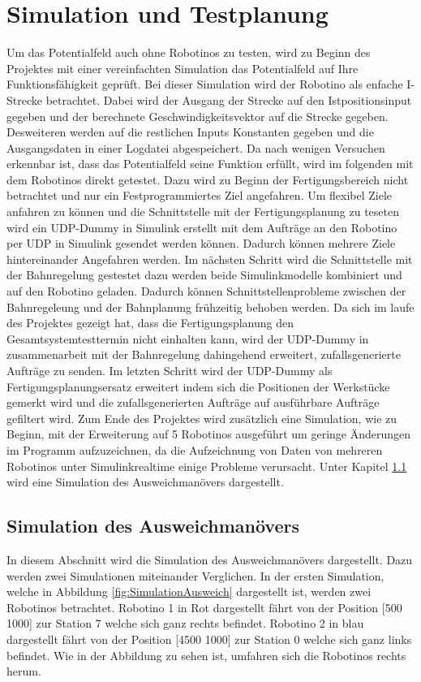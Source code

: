 \chapter{Simulation und Testplanung}
Um das Potentialfeld auch ohne Robotinos zu testen, wird zu Beginn des Projektes mit einer vereinfachten Simulation das Potentialfeld auf Ihre Funktionsfähigkeit geprüft. Bei dieser Simulation wird der Robotino als enfache I-Strecke betrachtet. Dabei wird der Ausgang der Strecke auf den Istpositionsinput gegeben und der berechnete Geschwindigkeitsvektor auf die Strecke gegeben. Desweiteren werden auf die restlichen Inputs Konstanten gegeben und die Ausgangsdaten in einer Logdatei abgespeichert. Da nach wenigen Versuchen erkennbar ist, dass das Potentialfeld seine Funktion erfüllt, wird im folgenden mit dem Robotinos direkt getestet. Dazu wird zu Beginn der Fertigungsbereich nicht betrachtet und nur ein Festprogrammiertes Ziel angefahren. Um flexibel Ziele anfahren zu können und die Schnittstelle mit der Fertigungsplanung zu teseten wird ein UDP-Dummy in Simulink erstellt mit dem Aufträge an den Robotino per UDP in Simulink gesendet werden können. Dadurch können mehrere Ziele hintereinander Angefahren werden. Im nächsten Schritt wird die Schnittstelle mit der Bahnregelung gestestet dazu werden beide Simulinkmodelle kombiniert und auf den Robotino geladen. Dadurch können Schnittstellenprobleme zwischen der Bahnregeleung und der Bahnplanung frühzeitig behoben werden. Da sich im laufe des Projektes gezeigt hat, dass die Fertigungsplanung den Gesamtsystemtesttermin nicht einhalten kann, wird der UDP-Dummy in zusammenarbeit mit der Bahnregelung dahingehend erweitert, zufallsgenerierte Aufträge zu senden. Im letzten Schritt wird der UDP-Dummy als Fertigungsplanungsersatz erweitert indem sich die Positionen der Werkstücke gemerkt wird und die zufallsgenerierten Aufträge auf ausführbare Aufträge gefiltert wird. Zum Ende des Projektes wird zusätzlich eine Simulation, wie zu Beginn, mit der Erweiterung auf 5 Robotinos ausgeführt um geringe Änderungen im Programm aufzuzeichnen, da die Aufzeichnung von Daten von mehreren Robotinos unter Simulinkrealtime einige Probleme verursacht. Unter Kapitel \ref{} wird eine Simulation des Ausweichmanövers dargestellt.
\section{Simulation des Ausweichmanövers}
In diesem Abschnitt wird die Simulation des Ausweichmanövers dargestellt. Dazu werden zwei Simulationen miteinander Verglichen. In der ersten Simulation, welche in Abbildung \ref{fig:SimulationAusweich} dargestellt ist, werden zwei Robotinos betrachtet. Robotino 1 in Rot dargestellt fährt von der Position [500 1000] zur Station 7 welche sich ganz rechts befindet. Robotino 2 in blau dargestellt fährt von der Position [4500 1000] zur Station 0 welche sich ganz links befindet. Wie in der Abbildung zu sehen ist, umfahren sich die Robotinos rechts herum.

